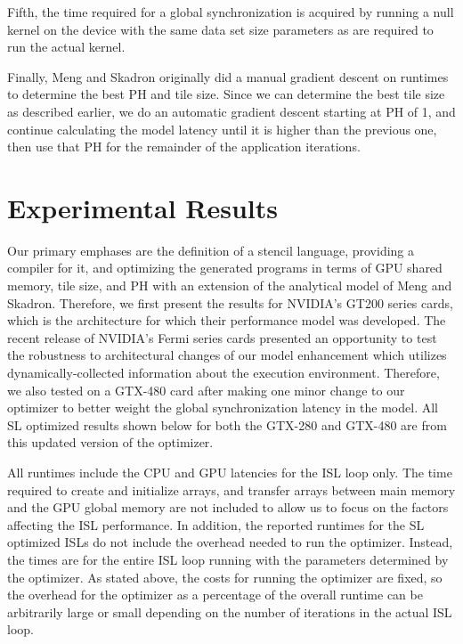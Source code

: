 \documentclass[preprint,nocopyrightspace]{styles/sigplanconf}
\begin{document}
Fifth, the time required for a global synchronization is acquired by running a
null kernel on the device with the same data set size parameters as are
required to run the actual kernel.

Finally, Meng and Skadron originally did a manual gradient descent on runtimes to determine 
the best PH and tile size.  Since we can determine the best tile size as described earlier, 
we do an automatic gradient descent starting at PH of 1, 
and continue calculating the model latency until it is higher than the previous one, 
then use that PH for the remainder of the application iterations.

\section{Experimental Results}

Our primary emphases are the definition of a stencil language, 
providing a compiler for it,
and optimizing the generated programs in terms of
GPU shared memory, tile size, and PH with an extension of the analytical model
of Meng and Skadron.  Therefore, we first present the results for NVIDIA's
GT200 series cards, which is the architecture for which their
performance model was developed.  The recent release of NVIDIA's Fermi series
cards presented an opportunity to test the robustness to architectural changes
of our model enhancement which utilizes dynamically-collected
information about the execution environment.  Therefore, we also tested on a
GTX-480 card after making one minor change to our optimizer to better weight
the global synchronization latency in the model.  All SL optimized results
shown below for both the GTX-280 and GTX-480 are from this updated version of
the optimizer.

All runtimes include the CPU and GPU latencies for the ISL loop only.
The time required to create and initialize arrays, and transfer arrays
between main memory and the GPU global memory are not included
to allow us to focus on the factors affecting the ISL performance.
In addition, the reported runtimes for the SL optimized ISLs
do not include the overhead needed to run the optimizer.
Instead, the times are for the entire ISL loop running with the 
parameters determined by the optimizer.
As stated above, the costs for running the optimizer are fixed,
so the overhead for the optimizer as a percentage of the
overall runtime can be arbitrarily large or small depending 
on the number of iterations in the actual ISL loop.
\end{document}
